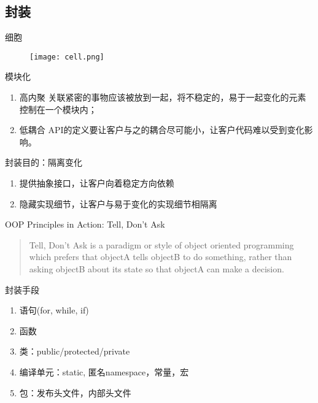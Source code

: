 \subsection{封装}

\begin{frame}[fragile]{细胞}
  \begin{figure}
    \centering
    \texttt{[image: cell.png]}
  \end{figure}
\end{frame}

\begin{frame}[fragile]{模块化}
\begin{enumerate}
  \item \alert{高内聚} 关联紧密的事物应该被放到一起，将不稳定的，易于一起变化的元素控制在一个模块内；
  \item \alert{低耦合} API的定义要让客户与之的耦合尽可能小，让客户代码难以受到变化影响。
\end{enumerate}
\end{frame}

\begin{frame}[fragile]{封装目的：隔离变化}
\begin{enumerate}
  \item 提供抽象接口，让客户向着稳定方向依赖
  \item 隐藏实现细节，让客户与易于变化的实现细节相隔离
\end{enumerate}
\end{frame}

\begin{frame}[fragile]{OOP Principles in Action: Tell, Don't Ask}
\begin{block}{}
\begin{quote}
Tell, Don't Ask is a paradigm or style of object oriented programming which prefers that objectA tells objectB to do something, rather than asking objectB about its state so that objectA can make a decision.
\end{quote}
\end{block}
\end{frame}

\begin{frame}[fragile]{封装手段}
\begin{enumerate}
  \item 语句(for, while, if)
  \item 函数
  \item 类：public/protected/private
  \item 编译单元：static, 匿名namespace，常量，宏
  \item 包：发布头文件，内部头文件
\end{enumerate}
\end{frame}

